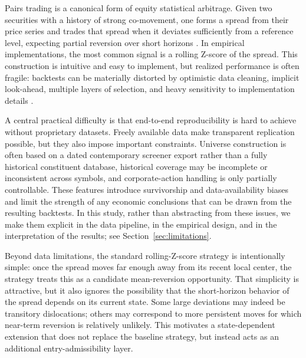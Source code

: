 \documentclass[11pt,a4paper]{article}
\begin{document}
Pairs trading is a canonical form of equity statistical arbitrage. Given two securities with a history of strong co-movement, one forms a spread from their price series and trades that spread when it deviates sufficiently from a reference level, expecting partial reversion over short horizons \cite{gatev2006pairs,vidyamurthy2004pairs}. In empirical implementations, the most common signal is a rolling Z-score of the spread. This construction is intuitive and easy to implement, but realized performance is often fragile: backtests can be materially distorted by optimistic data cleaning, implicit look-ahead, multiple layers of selection, and heavy sensitivity to implementation details \cite{harvey2016and,bailey2017probability}.

A central practical difficulty is that end-to-end reproducibility is hard to achieve without proprietary datasets. Freely available data make transparent replication possible, but they also impose important constraints. Universe construction is often based on a dated contemporary screener export rather than a fully historical constituent database, historical coverage may be incomplete or inconsistent across symbols, and corporate-action handling is only partially controllable. These features introduce survivorship and data-availability biases and limit the strength of any economic conclusions that can be drawn from the resulting backtests. In this study, rather than abstracting from these issues, we make them explicit in the data pipeline, in the empirical design, and in the interpretation of the results; see Section~\ref{sec:limitations}.

Beyond data limitations, the standard rolling-Z-score strategy is intentionally simple: once the spread moves far enough away from its recent local center, the strategy treats this as a candidate mean-reversion opportunity. That simplicity is attractive, but it also ignores the possibility that the short-horizon behavior of the spread depends on its current state. Some large deviations may indeed be transitory dislocations; others may correspond to more persistent moves for which near-term reversion is relatively unlikely. This motivates a state-dependent extension that does not replace the baseline strategy, but instead acts as an additional entry-admissibility layer.
\end{document}
